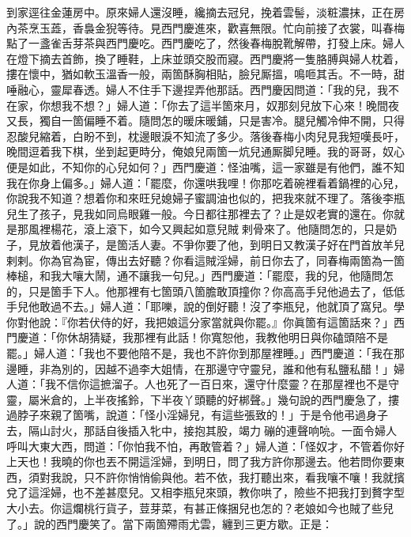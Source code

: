 到家逕往金蓮房中。原來婦人還沒睡，纔摘去冠兒，挽着雲髻，淡粧濃抹，正在房內茶烹玉蕋，香裊金猊等待。見西門慶進來，歡喜無限。忙向前接了衣裳，叫春梅點了一盞雀舌芽茶與西門慶吃。西門慶吃了，然後春梅脫靴解帶，打發上床。婦人在燈下摘去首飾，換了睡鞋，上床並頭交股而寢。西門慶將一隻胳膊與婦人枕着，摟在懷中，猶如軟玉溫香一般，兩箇酥胸相貼，臉兒厮搵，鳴咂其舌。不一時，甜唾融心，靈犀春透。婦人不住手下邊捏弄他那話。西門慶因問道：「我的兒，我不在家，你想我不想？」婦人道：「你去了這半箇來月，奴那刻兒放下心來！晚間夜又長，獨自一箇偏睡不着。隨問怎的暖床暖鋪，只是害冷。{}{}腿兒觸冷伸不開，只得忍酸兒縮着，白盼不到，枕邊眼淚不知流了多少。落後春梅小肉兒見我短嘆長吁，晚間逗着我下棋，坐到起更時分，俺娘兒兩箇一炕兒通厮脚兒睡。我的哥哥，奴心便是如此，不知你的心兒如何？」西門慶道：怪油嘴，這一家雖是有他們，誰不知我在你身上偏多。」{}婦人道：「罷麼，你還哄我哩！你那吃着碗裡看着鍋裡的心兒，你說我不知道？想着你和來旺兒媳婦子蜜調油也似的，把我來就不理了。落後李瓶兒生了孩子，見我如同烏眼雞一般。今日都往那裡去了？止是奴老實的還在。{}你就是那風裡楊花，滾上滾下，如今又興起如意兒賊𢱉剌骨來了。他隨問怎的，只是奶子，見放着他漢子，是箇活人妻。不爭你要了他，到明日又教漢子好在門首放羊兒剌剌。你為官為宦，傳出去好聽？你看這賊淫婦，前日你去了，同春梅兩箇為一箇棒槌，和我大嚷大鬧，通不讓我一句兒。」西門慶道：「罷麼，我的兒，他隨問怎的，只是箇手下人。他那裡有七箇頭八箇膽敢頂撞你？你高高手兒他過去了，低低手兒他敢過不去。」{}婦人道：「耶嚛，說的倒好聽！沒了李瓶兒，他就頂了窩兒。學你對他說：『你若伏侍的好，我把娘這分家當就與你罷。』你眞箇有這箇話來？」{}西門慶道：「你休胡猜疑，我那裡有此話！你寬恕他，我教他明日與你磕頭陪不是罷。」婦人道：「我也不要他陪不是，我也不許你到那屋裡睡。」西門慶道：「我在那邊睡，非為別的，因越不過李大姐情，在那邊守守靈兒，誰和他有私鹽私醋！」婦人道：「我不信你這摭溜子。人也死了一百日來，還守什麼靈？在那屋裡也不是守靈，屬米倉的，上半夜搖鈴，下半夜丫頭聽的好梆聲。」幾句說的西門慶急了，摟過脖子來親了箇嘴，說道：「怪小淫婦兒，有這些張致的！」于是令他弔過身子去，隔山討火，那話自後插入牝中，接抱其股，竭力𢵞磞的連聲响喨。一面令婦人呼叫大東大西，問道：「你怕我不怕，再敢管着？」婦人道：「怪奴才，不管着你好上天也！我曉的你也丟不開這淫婦，到明日，問了我方許你那邊去。他若問你要東西，須對我說，只不許你悄悄偷與他。若不依，我打聽出來，看我嚷不嚷！我就擯兌了這淫婦，也不差甚麼兒。又相李瓶兒來頭，教你哄了，險些不把我打到贅字型大小去。{}你這爛桃行貨子，荳芽菜，有甚正條捆兒也怎的？老娘如今也賊了些兒了。」{}說的西門慶笑了。當下兩箇殢雨尤雲，纏到三更方歇。正是：

